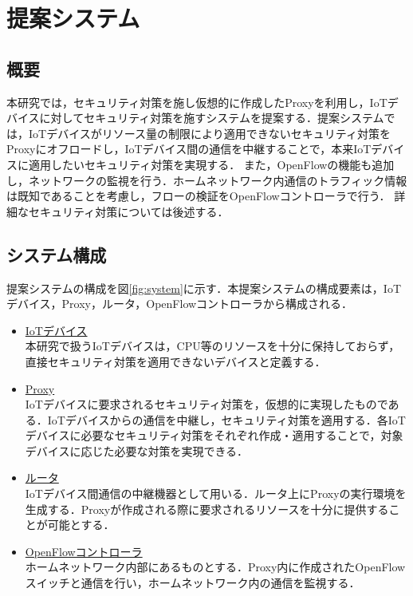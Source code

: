 \documentclass[Japanese]{dicomopapers}
\begin{document}
\section{提案システム}
\subsection{概要}
本研究では，セキュリティ対策を施し仮想的に作成したProxyを利用し，IoTデバイスに対してセキュリティ対策を施すシステムを提案する．提案システムでは，IoTデバイスがリソース量の制限により適用できないセキュリティ対策をProxyにオフロードし，IoTデバイス間の通信を中継することで，本来IoTデバイスに適用したいセキュリティ対策を実現する．
また，OpenFlowの機能も追加し，ネットワークの監視を行う．ホームネットワーク内通信のトラフィック情報は既知であることを考慮し，フローの検証をOpenFlowコントローラで行う．
詳細なセキュリティ対策については後述する．


\subsection{システム構成}
提案システムの構成を図\ref{fig:system}に示す．本提案システムの構成要素は，IoTデバイス，Proxy，ルータ，OpenFlowコントローラから構成される．
\begin{itemize}
	\item \underline{IoTデバイス}\mbox{}\\
	      本研究で扱うIoTデバイスは，CPU等のリソースを十分に保持しておらず，直接セキュリティ対策を適用できないデバイスと定義する．
	\item \underline{Proxy}\mbox{}\\
	      IoTデバイスに要求されるセキュリティ対策を，仮想的に実現したものである．IoTデバイスからの通信を中継し，セキュリティ対策を適用する．各IoTデバイスに必要なセキュリティ対策をそれぞれ作成・適用することで，対象デバイスに応じた必要な対策を実現できる．
	\item \underline{ルータ}\mbox{}\\
	      IoTデバイス間通信の中継機器として用いる．ルータ上にProxyの実行環境を生成する．Proxyが作成される際に要求されるリソースを十分に提供することが可能とする．
	\item \underline{OpenFlowコントローラ}\mbox{}\\
	      ホームネットワーク内部にあるものとする．Proxy内に作成されたOpenFlowスイッチと通信を行い，ホームネットワーク内の通信を監視する．
\end{itemize}
\end{document}

